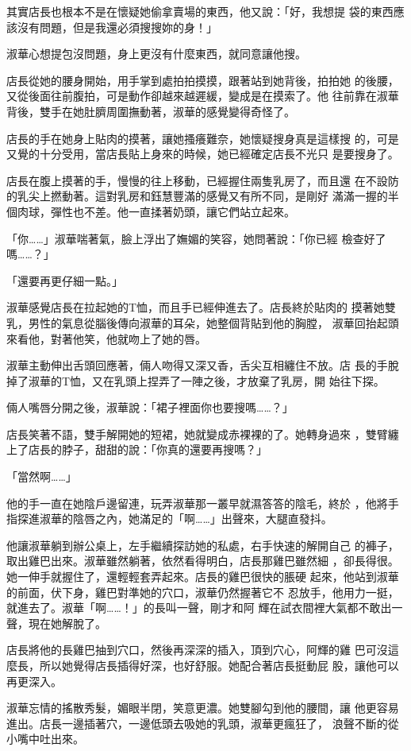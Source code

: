 其實店長也根本不是在懷疑她偷拿賣場的東西，他又說：「好，我想提
袋的東西應該沒有問題，但是我還必須搜搜妳的身！」

淑華心想提包沒問題，身上更沒有什麼東西，就同意讓他搜。

店長從她的腰身開始，用手掌到處拍拍摸摸，跟著站到她背後，拍拍她
的後腰，又從後面往前腹拍，可是動作卻越來越遲緩，變成是在摸索了。他
往前靠在淑華背後，雙手在她肚臍周圍撫動著，淑華的感覺變得奇怪了。

店長的手在她身上貼肉的摸著，讓她搔癢難奈，她懷疑搜身真是這樣搜
的，可是又覺的十分受用，當店長貼上身來的時候，她已經確定店長不光只
是要搜身了。

店長在腹上摸著的手，慢慢的往上移動，已經握住兩隻乳房了，而且還
在不設防的乳尖上撚動著。這對乳房和鈺慧豐滿的感覺又有所不同，是剛好
滿滿一握的半個肉球，彈性也不差。他一直揉著奶頭，讓它們站立起來。

「你……」淑華喘著氣，臉上浮出了嫵媚的笑容，她問著說：「你已經
檢查好了嗎……？」

「還要再更仔細一點。」

淑華感覺店長在拉起她的T恤，而且手已經伸進去了。店長終於貼肉的
摸著她雙乳，男性的氣息從腦後傳向淑華的耳朵，她整個背貼到他的胸膛，
淑華回抬起頭來看他，對著他笑，他就吻上了她的唇。

淑華主動伸出舌頭回應著，倆人吻得又深又香，舌尖互相纏住不放。店
長的手脫掉了淑華的T恤，又在乳頭上捏弄了一陣之後，才放棄了乳房，開
始往下探。

倆人嘴唇分開之後，淑華說：「裙子裡面你也要搜嗎……？」

店長笑著不語，雙手解開她的短裙，她就變成赤裸裸的了。她轉身過來
，雙臂纏上了店長的脖子，甜甜的說：「你真的還要再搜嗎？」

「當然啊……」

他的手一直在她陰戶邊留連，玩弄淑華那一叢早就濕答答的陰毛，終於
，他將手指探進淑華的陰唇之內，她滿足的「啊……」出聲來，大腿直發抖。

他讓淑華躺到辦公桌上，左手繼續探訪她的私處，右手快速的解開自己
的褲子，取出雞巴出來。淑華雖然躺著，依然看得明白，店長那雞巴雖然細
，卻長得很。她一伸手就握住了，還輕輕套弄起來。店長的雞巴很快的脹硬
起來，他站到淑華的前面，伏下身，雞巴對準她的穴口，淑華仍然握著它不
忍放手，他用力一挺，就進去了。淑華「啊……！」的長叫一聲，剛才和阿
輝在試衣間裡大氣都不敢出一聲，現在她解脫了。

店長將他的長雞巴抽到穴口，然後再深深的插入，頂到穴心，阿輝的雞
巴可沒這麼長，所以她覺得店長插得好深，也好舒服。她配合著店長挺動屁
股，讓他可以再更深入。

淑華忘情的搖散秀髮，媚眼半閉，笑意更濃。她雙腳勾到他的腰間，讓
他更容易進出。店長一邊插著穴，一邊低頭去吸她的乳頭，淑華更瘋狂了，
浪聲不斷的從小嘴中吐出來。

